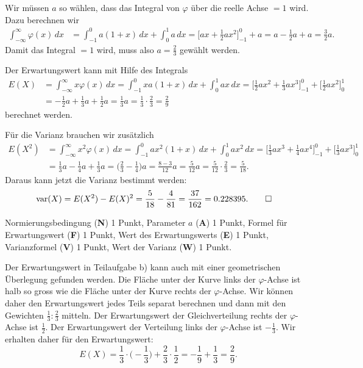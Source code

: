 \begin{loesung}
\begin{teilaufgaben}
\item
Wir müssen $a$ so wählen, dass das Integral von $\varphi$ über die reelle
Achse $=1$ wird.
Dazu berechnen wir
\begin{align*}
\int_{-\infty}^\infty\varphi(x)\,dx
&=
\int_{-1}^0a(1+x)\,dx +\int_0^1 a\,dx
=
\biggl[ax+\frac12ax^2\biggr]_{-1}^0 + a
=
a-\frac12a+a=\frac32a.
\end{align*}
Damit das Integral $=1$ wird, muss also $a=\frac23$ gewählt werden.
\item
Der Erwartungswert kann mit Hilfe des Integrals
\begin{align*}
E(X)
&=
\int_{-\infty}^\infty x\varphi(x)\,dx
=
\int_{-1}^0 xa(1+x)\,dx + \int_0^1ax\,dx
=
\biggl[
\frac12ax^2+\frac13ax^3
\biggr]_{-1}^0
+
\biggl[
\frac12ax^2
\biggr]_0^1
\\
&=
-\frac12a +\frac13a +\frac12a
=
\frac13a
=
\frac13\cdot\frac23
=
\frac29
\end{align*}
berechnet werden.
\item
Für die Varianz brauchen wir zusätzlich
\begin{align*}
E(X^2)
&=
\int_{-\infty}^\infty x^2\varphi(x)\,dx
=
\int_{-1}^0 ax^2(1+x)\,dx +\int_0^1 ax^2\,dx
=
\biggl[
\frac13ax^3 + \frac14ax^4
\biggr]_{-1}^0
+
\biggl[
\frac13ax^3
\biggr]_0^1
\\
&=
\frac13a - \frac14a + \frac13a
=
\biggl(\frac23-\frac14\biggr)a
=
\frac{8-3}{12}a
=
\frac5{12}a
=
\frac5{12}\cdot\frac{2}{3}
=
\frac{5}{18}.
\end{align*}
Daraus kann jetzt die Varianz bestimmt werden:
\begin{align*}
\operatorname{var}(X)
&=
E(X^2)-E(X)^2
=
\frac{5}{18}-\frac{4}{81}
=
\frac{37}{162}
=
0.228395.
\qedhere
\end{align*}
\end{teilaufgaben}
\end{loesung}

\begin{bewertung}
Normierungsbedingung ({\bf N}) 1 Punkt,
Parameter $a$ ({\bf A}) 1 Punkt,
Formel für Erwartungswert ({\bf F}) 1 Punkt,
Wert des Erwartungswerts ({\bf E}) 1 Punkt,
Varianzformel ({\bf V}) 1 Punkt,
Wert der Varianz ({\bf W}) 1 Punkt.
\end{bewertung}

\begin{diskussion}
Der Erwartungswert in Teilaufgabe b) kann auch mit einer geometrischen 
Überlegung gefunden werden.
Die Fläche unter der Kurve links der $\varphi$-Achse  ist halb so gross
wie die Fläche unter der Kurve rechts der $\varphi$-Achse. 
Wir können daher den Erwartungswert jedes Teils separat berechnen und
dann mit den Gewichten $\frac13\colon \frac23$ mitteln.
Der Erwartungswert der Gleichverteilung rechts der $\varphi$-Achse ist
$\frac12$.
Der Erwartungswert der Verteilung links der $\varphi$-Achse ist
$-\frac13$.
Wir erhalten daher für den Erwartungswert:
\[
E(X)
=
\frac13\cdot\biggl(-\frac13\biggr) + \frac23\cdot\frac 12
=
-\frac19 + \frac13=\frac29.
\]
\end{diskussion}
